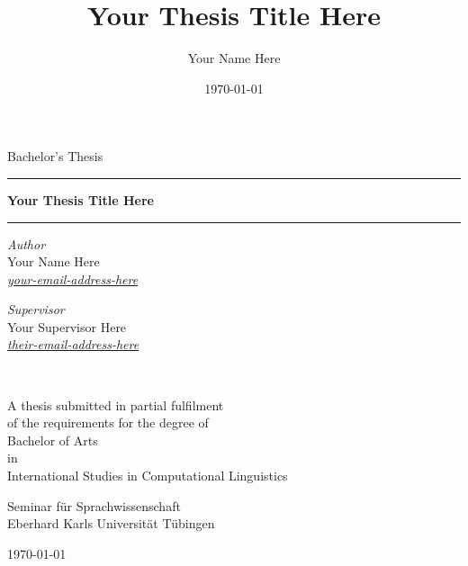 \documentclass[a4paper]{article}
\title{Your Thesis Title Here}
\author{Your Name Here}
\date{\today}
\begin{document}
\begin{titlepage}
\begin{center}
\vspace*{.15\textheight}
{\Large Bachelor's Thesis}
\vspace{2em}

\hrule
\vspace{0.6cm}
{\bfseries\huge
Your Thesis Title Here
}\\[1cm] 
\hrule
\vspace*{.05\textheight}
 
\begin{minipage}[t]{0.49\textwidth}
\begin{flushleft} 
{\large
\textit{Author}\\
Your Name Here}\\
\href{mailto:your-email-address-here}{\textit{your-email-address-here}}\\
\end{flushleft}
\end{minipage}
\begin{minipage}[t]{0.49\textwidth}
\begin{flushright}
{\large
\textit{Supervisor}\\
Your Supervisor Here}\\
\href{mailto:their-email-address-here}{\textit{their-email-address-here}}\\
\end{flushright}
\end{minipage}\\

\vfill

A thesis submitted in partial fulfilment\\
of the requirements for the degree of\\[2mm]
{\large Bachelor of Arts}\\
in\\[1mm]
{\large International Studies in Computational Linguistics}

\vspace*{.1\textheight}

{\large Seminar für Sprachwissenschaft\\
Eberhard Karls Universität Tübingen

\vspace{1em}
\today}
\end{center}
\end{titlepage}

\end{document}
